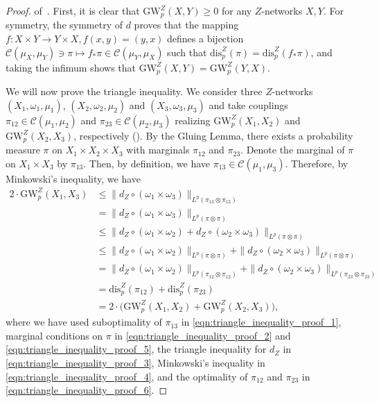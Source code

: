 \documentclass[twoside,11pt]{article}
\theoremstyle{definition}
\newcommand{\dgwz}{\mathrm{GW}_p^Z}
\newcommand{\disp}{\mathrm{dis}_p}
\begin{document}
\begin{proof}of~.
    First, it is clear that $\dgwz(X,Y)\geq 0$ for any $Z$-networks $X,Y$. For symmetry, the symmetry of $d$ proves that the mapping $f:X\times Y \to Y\times X, f(x,y)=(y,x)$ defines a bijection $\mathcal{C}(\mu_X,\mu_Y)\ni \pi \mapsto f_* \pi \in \mathcal{C}(\mu_Y,\mu_X)$ such that $\disp^Z(\pi) = \disp^Z(f_*\pi)$, and taking the infimum shows that $\dgwz(X,Y)=\dgwz(Y,X)$.  
    
    We will now prove the triangle inequality. We consider three $Z$-networks $(X_1,\omega_{1},\mu_1)$, $(X_2,\omega_{2}, \mu_2)$ and $(X_3, \omega_{3}, \mu_3)$ and take couplings $\pi_{12}\in \mathcal{C}(\mu_1,\mu_2)$ and $\pi_{23}\in \mathcal{C}(\mu_2,\mu_3)$ realizing $\dgwz(X_1,X_2)$ and $\dgwz(X_2,X_3)$, respectively (). By the Gluing Lemma, there exists a probability measure $\pi$ on $X_1\times X_2 \times X_3$ with marginals $\pi_{12}$ and $\pi_{23}$. Denote the marginal of $\pi$ on $X_1\times X_3$ by $\pi_{13}$. Then, by definition, we have $\pi_{13}\in \mathcal{C}(\mu_1,\mu_3)$. Therefore, by Minkowski's inequality, we have
    \begin{align}
        2 \cdot \dgwz (X_1, X_3) & \leq \|d_Z\circ (\omega_1\times \omega_3)\|_{L^p(\pi_{13}\otimes \pi_{13})} \label{eqn:triangle_inequality_proof_1} \\ &= \|d_Z\circ (\omega_1\times \omega_3)\|_{L^p(\pi \otimes \pi)} \label{eqn:triangle_inequality_proof_2} \\ &\leq \|d_Z\circ (\omega_{1} \times \omega_{2}) + d_Z\circ (\omega_{2} \times \omega_{3})\|_{L^p(\pi\otimes \pi)} \label{eqn:triangle_inequality_proof_3} \\ &\leq \|d_Z\circ (\omega_{1} \times \omega_{2})\|_{L^p(\pi\otimes \pi)} + \|d_Z\circ (\omega_{2} \times \omega_{3})\|_{L^p(\pi\otimes \pi)} \label{eqn:triangle_inequality_proof_4} \\ &=\|d_Z\circ (\omega_{1} \times \omega_{2})\|_{L^p(\pi_{12}\otimes \pi_{12})} + \|d_Z\circ (\omega_{2} \times \omega_{3})\|_{L^p(\pi_{23}\otimes \pi_{23})} \label{eqn:triangle_inequality_proof_5} \\ &= \disp^Z(\pi_{12}) + \disp^Z(\pi_{23})\\
        &= 2 \cdot \big(\dgwz(X_1,X_2) + \dgwz(X_2,X_3)\big) \label{eqn:triangle_inequality_proof_6},
    \end{align}
    where we have used suboptimality of $\pi_{13}$ in \eqref{eqn:triangle_inequality_proof_1}, marginal conditions on $\pi$ in \eqref{eqn:triangle_inequality_proof_2} and \eqref{eqn:triangle_inequality_proof_5},  the triangle inequality for $d_Z$ in \eqref{eqn:triangle_inequality_proof_3}, Minkowski's inequality in \eqref{eqn:triangle_inequality_proof_4}, and the optimality of $\pi_{12}$ and $\pi_{23}$ in \eqref{eqn:triangle_inequality_proof_6}.
    

\end{proof}
\end{document}
